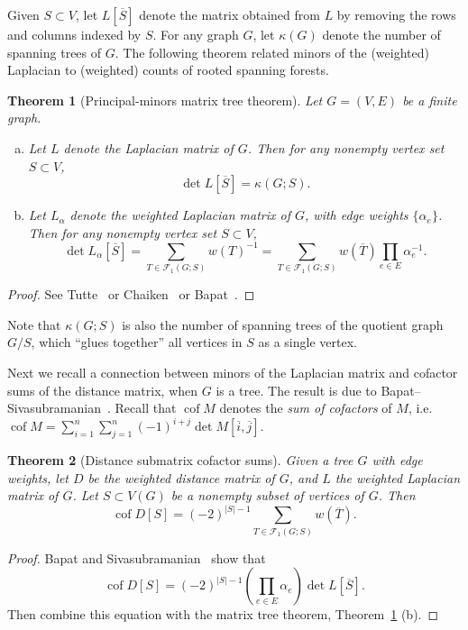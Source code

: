 \documentclass{amsart}
\newtheorem{thm}{Theorem}
\theoremstyle{definition}
\DeclareMathOperator{\cof}{cof}
\newcommand{\trees}{\mathcal{F}_1}
\begin{document}
Given $S \subset V$,
let $L[\overline S]$ denote the matrix obtained from $L$ by removing the rows and columns indexed by $S$.
For any graph $G$, let $\kappa(G)$ denote the number of spanning trees of $G$.
The following theorem related minors of the (weighted) Laplacian to (weighted) counts of rooted spanning forests.
\begin{thm}[Principal-minors matrix tree theorem]
\label{thm:matrix-tree}
Let $G = (V,E)$ be a finite graph.
\begin{enumerate}[(a)]
\item 
Let $L$ denote the Laplacian matrix of $G$.
Then for any nonempty vertex set $S \subset V$,
\begin{equation}
	\det L[\overline S] = \kappa( G ; S) .
\end{equation}

\item 
Let $L_\alpha$ denote the weighted Laplacian matrix of $G$, with edge weights $\{\alpha_e\}$. 
Then for any nonempty vertex set $S \subset V$,
\begin{equation}
	\det L_\alpha[\overline S] = \sum_{T \in \trees( G ; S)} w(T)^{-1}
	= \sum_{T \in \trees(G; S)} w(\overline{T}) \prod_{e \in E} \alpha_e^{-1} .
\end{equation}
\end{enumerate}
\end{thm}
\begin{proof}
See Tutte~\cite[Section VI.6, Equation (VI.6.7)]{tutte} or Chaiken~\cite{chaiken} or Bapat~\cite[Theorem 4.7]{bapat}.
\end{proof}

Note that $\kappa(G;S)$ is also the number of 
spanning trees of the quotient graph $G / S$, which ``glues together'' all vertices in $S$ as a single vertex.

Next we recall a connection between minors of the Laplacian matrix and cofactor sums of the distance matrix, when $G$ is a tree.
The result is due to Bapat--Sivasubramanian~\cite{bapat-sivasubramanian}.
Recall that $\cof M$ denotes the {\em sum of cofactors} of $M$, i.e. 
$\displaystyle
	\cof M = \sum_{i = 1}^{n} \sum_{j = 1}^{n} (-1)^{i + j} \det M[\overline{i},\overline{j}].
$

\begin{thm}[Distance submatrix cofactor sums]
\label{thm:distance-sub-cof}
Given a tree $G$ with edge weights,
let $D$ be the weighted distance matrix of $G$, and $L$ the weighted Laplacian matrix of $G$.
Let $S \subset V(G)$ be a nonempty subset of vertices of $G$. 
Then
\begin{equation}
	\cof D[S] = (-2)^{|S|-1} \sum_{T \in \trees(G; S)} w(\overline{T}).
\end{equation}
\end{thm}
\begin{proof}
Bapat and Sivasubramanian~\cite[Theorem 11]{bapat-sivasubramanian}
show that
\[
	\cof D[S] = (-2)^{|S|-1} \left( \prod_{e \in E} \alpha_e \right) \det L[\overline S] .
\]
Then combine this equation with the matrix tree theorem,
Theorem~\ref{thm:matrix-tree} (b).
\end{proof}
\end{document}
